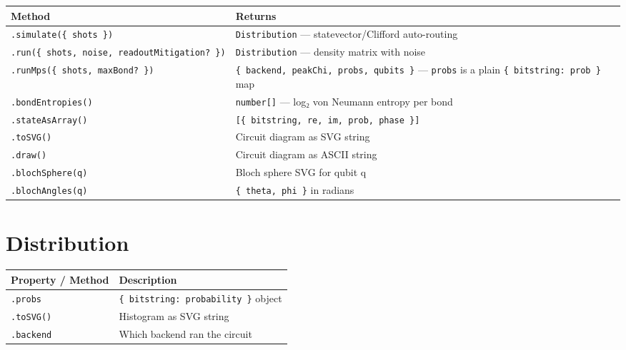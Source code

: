 \documentclass[
  11pt,
  letterpaper,
  oneside]{scrbook}
\begin{document}
\begin{longtable}[]{@{}
  >{\raggedright\arraybackslash}p{}
  >{\raggedright\arraybackslash}p{}@{}}
\toprule\noalign{}
\begin{minipage}[b]{\linewidth}\raggedright
Method
\end{minipage} & \begin{minipage}[b]{\linewidth}\raggedright
Returns
\end{minipage} \\
\midrule\noalign{}
\endhead
\bottomrule\noalign{}
\endlastfoot
\texttt{.simulate(\{\ shots\ \})} & \texttt{Distribution} ---
statevector/Clifford auto-routing \\
\texttt{.run(\{\ shots,\ noise,\ readoutMitigation?\ \})} &
\texttt{Distribution} --- density matrix with noise \\
\texttt{.runMps(\{\ shots,\ maxBond?\ \})} &
\texttt{\{\ backend,\ peakChi,\ probs,\ qubits\ \}} --- \texttt{probs}
is a plain \texttt{\{\ bitstring:\ prob\ \}} map \\
\texttt{.bondEntropies()} & \texttt{number{[}{]}} --- log₂ von Neumann
entropy per bond \\
\texttt{.stateAsArray()} &
\texttt{{[}\{\ bitstring,\ re,\ im,\ prob,\ phase\ \}{]}} \\
\texttt{.toSVG()} & Circuit diagram as SVG string \\
\texttt{.draw()} & Circuit diagram as ASCII string \\
\texttt{.blochSphere(q)} & Bloch sphere SVG for qubit q \\
\texttt{.blochAngles(q)} & \texttt{\{\ theta,\ phi\ \}} in radians \\
\end{longtable}

\section*{Distribution}\label{distribution}


\begin{longtable}[]{@{}ll@{}}
\toprule\noalign{}
Property / Method & Description \\
\midrule\noalign{}
\endhead
\bottomrule\noalign{}
\endlastfoot
\texttt{.probs} & \texttt{\{\ bitstring:\ probability\ \}} object \\
\texttt{.toSVG()} & Histogram as SVG string \\
\texttt{.backend} & Which backend ran the circuit \\
\end{longtable}
\end{document}
